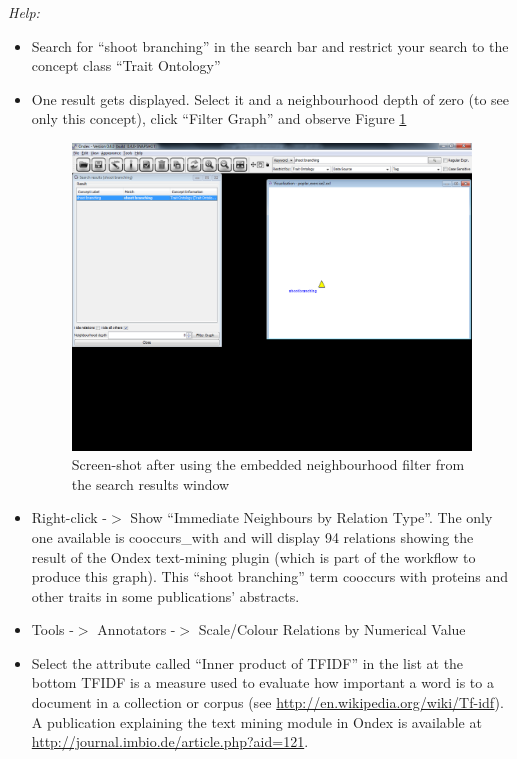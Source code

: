 \emph{Help:}
\begin{itemize}
\item Search for ``shoot branching'' in the search bar and restrict your search to the concept class ``Trait Ontology''
\item One result gets displayed. Select it and a neighbourhood depth of zero (to see only this concept), click ``Filter Graph'' and observe Figure \ref{fig:poplar_ex2_searchres}
\begin{figure}[H]
\centering
\includegraphics[scale=0.3]{images/Jun12/poplar_ex2_searchres.png} 
\caption{Screen-shot after using the embedded neighbourhood filter from the search results window}
\label{fig:poplar_ex2_searchres}
\end{figure}

\item Right-click -$>$ Show ``Immediate Neighbours by Relation Type''. 
The only one available is cooccurs\_with and will display 94 relations showing the result of the Ondex text-mining plugin (which is part of the workflow to produce this graph).
This ``shoot branching'' term cooccurs with proteins and other traits in some publications' abstracts.

\item Tools -$>$ Annotators -$>$ Scale/Colour Relations by Numerical Value
\item Select the attribute called ``Inner product of TFIDF'' in the list at the bottom
TFIDF is a measure used to evaluate how important a word is to a document in a collection or corpus (see \url{http://en.wikipedia.org/wiki/Tf-idf}).
A publication explaining the text mining module in Ondex is available at \url{http://journal.imbio.de/article.php?aid=121}.


\end{itemize}
